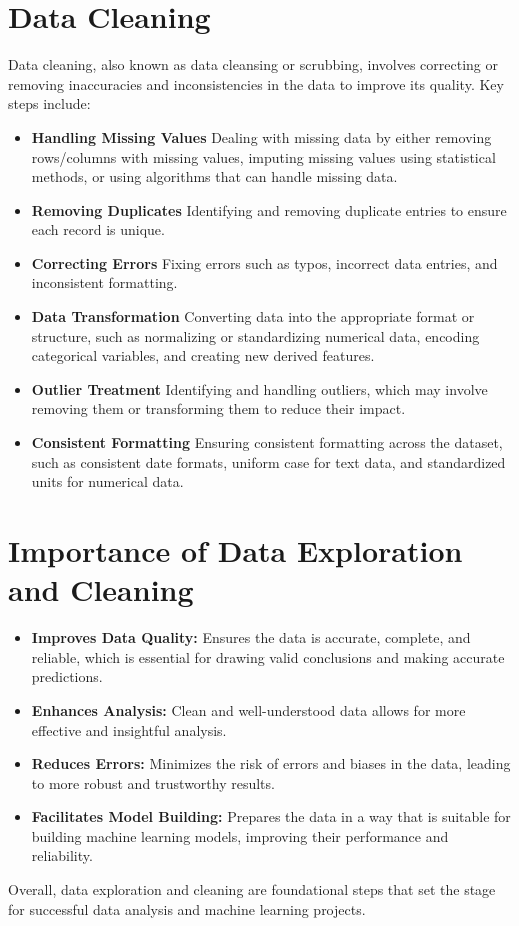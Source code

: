 \documentclass[
]{book}
\providecommand{\tightlist}{%
  \setlength{\itemsep}{0pt}\setlength{\parskip}{0pt}}
\begin{document}
\hypertarget{data-cleaning}{%
\section*{Data Cleaning}\label{data-cleaning}}

Data cleaning, also known as data cleansing or scrubbing, involves correcting or removing inaccuracies and inconsistencies in the data to improve its quality. Key steps include:

\begin{itemize}
\item
  \textbf{Handling Missing Values}
  Dealing with missing data by either removing rows/columns with missing values, imputing missing values using statistical methods, or using algorithms that can handle missing data.
\item
  \textbf{Removing Duplicates}
  Identifying and removing duplicate entries to ensure each record is unique.
\item
  \textbf{Correcting Errors}
  Fixing errors such as typos, incorrect data entries, and inconsistent formatting.
\item
  \textbf{Data Transformation}
  Converting data into the appropriate format or structure, such as normalizing or standardizing numerical data, encoding categorical variables, and creating new derived features.
\item
  \textbf{Outlier Treatment}
  Identifying and handling outliers, which may involve removing them or transforming them to reduce their impact.
\item
  \textbf{Consistent Formatting}
  Ensuring consistent formatting across the dataset, such as consistent date formats, uniform case for text data, and standardized units for numerical data.
\end{itemize}

\hypertarget{importance-of-data-exploration-and-cleaning}{%
\section{Importance of Data Exploration and Cleaning}\label{importance-of-data-exploration-and-cleaning}}

\begin{itemize}
\tightlist
\item
  \textbf{Improves Data Quality:} Ensures the data is accurate, complete, and reliable, which is essential for drawing valid conclusions and making accurate predictions.
\item
  \textbf{Enhances Analysis:} Clean and well-understood data allows for more effective and insightful analysis.
\item
  \textbf{Reduces Errors:} Minimizes the risk of errors and biases in the data, leading to more robust and trustworthy results.
\item
  \textbf{Facilitates Model Building:} Prepares the data in a way that is suitable for building machine learning models, improving their performance and reliability.
\end{itemize}

Overall, data exploration and cleaning are foundational steps that set the stage for successful data analysis and machine learning projects.

  
\end{document}

